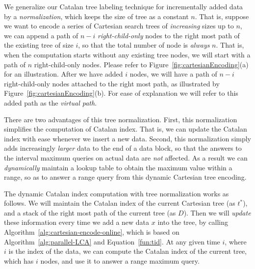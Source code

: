 We generalize our Catalan tree labeling technique for incrementally
added data by a {\em normalization}, which keeps the size of tree as a
constant $n$.  That is, suppose we want to encode a series of
Cartesian search trees of {\em increasing} sizes up to $n$, we can
append a path of $n-i$ {\em right-child-only} nodes to the right most
path of the existing tree of size $i$, so that the total number of
node is {\em always} $n$.  That is, when the computation starts
without any existing tree nodes, we will start with a path of $n$
right-child-only nodes.  Please refer to
Figure~\ref{fig:cartesianEncoding}(a) for an illustration.  After we
have added $i$ nodes, we will have a path of $n - i$ right-child-only
nodes attached to the right most path, as illustrated by
Figure~\ref{fig:cartesianEncoding}(b).  For ease of explanation we
will refer to this added path as the {\em virtual path}.

\begin{figure*}[!thb]
  \centering {}  
  \caption{Normalization of Cartesian trees of increasing sizes by
    adding a virtual path.}
  \label{fig:cartesianEncoding}
\end{figure*}

There are two advantages of this tree normalization.  First, this
normalization simplifies the computation of Catalan index.  That is,
we can update the Catalan index with ease whenever we insert a new
data.  Second, this normalization simply adds increasingly {\em
  larger} data to the end of a data block, so that the answers to the
interval maximum queries on actual data are {\em not} affected.  As a
result we can {\em dynamically} maintain a lookup table to obtain the
maximum value within a range, so as to answer a range query from this
dynamic Cartesian tree encoding.


The dynamic Catalan index computation with tree normalization works as
follows.  We will maintain the Catalan index of the current Cartesian
tree (as $t^*$), and a stack of the right most path of the current
tree (as $D$).  Then we will {\em update} these information every time
we add a new data $x$ into the tree, by calling
Algorithm~\ref{alg:cartesian-encode-online}, which is based on
Algorithm~\ref{alg:parallel-LCA} and Equation~\ref{fun:tid}.  At any
given time $i$, where $i$ is the index of the data, we can compute the
Catalan index of the current tree, which has $i$ nodes, and use it to
answer a range maximum query.

